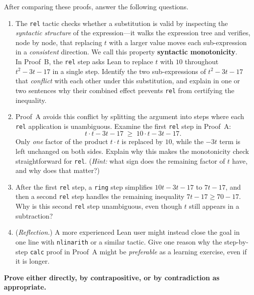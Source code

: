 \documentclass{article}
\begin{document}
\begin{enumerate}
\medskip
\noindent
After comparing these proofs, answer the following questions.

\begin{enumerate}
    \item The \texttt{rel} tactic checks whether a substitution is valid by inspecting the \emph{syntactic structure} 
    of the expression---it walks the expression tree and verifies, node by node, that replacing $t$ with a larger value moves each sub-expression in a
    \emph{consistent} direction.  We call this property \textbf{syntactic monotonicity}.\\

    In Proof~B, the \texttt{rel} step asks Lean to replace $t$ with $10$
    throughout $t^2 - 3t - 17$ in a single step.
    Identify the two sub-expressions of $t^2 - 3t - 17$ that
    \emph{conflict} with each other under this substitution, and explain
    in one or two sentences why their combined effect prevents
    \texttt{rel} from certifying the inequality.

\medskip
\item 
Proof~A avoids this conflict by splitting the argument into steps
where each \texttt{rel} application is unambiguous.
Examine the first \texttt{rel} step in Proof~A:
\[
  t \cdot t - 3t - 17 \;\geq\; 10 \cdot t - 3t - 17.
\]
Only \emph{one} factor of the product $t \cdot t$ is replaced by
$10$, while the $-3t$ term is left unchanged on both sides.
Explain why this makes the monotonicity check straightforward for
\texttt{rel}.  (\emph{Hint:} what sign does the remaining factor of
$t$ have, and why does that matter?)

\medskip
\item 
After the first \texttt{rel} step, a \texttt{ring} step simplifies
$10t - 3t - 17$ to $7t - 17$, and then a second \texttt{rel} step
handles the remaining inequality $7t - 17 \geq 70 - 17$.
Why is this second \texttt{rel} step unambiguous, even though $t$
still appears in a subtraction?

\item  (\emph{Reflection.})
A more experienced Lean user might instead close the goal in one
line with \texttt{nlinarith} or a similar tactic.
Give one reason why the step-by-step \texttt{calc} proof in Proof~A
might be \emph{preferable} as a learning exercise, even if it is
longer.
\end{enumerate}

\newpage 

\textbf{Prove either directly, by contrapositive, or by contradiction as appropriate.}


\end{enumerate}
\end{document}

